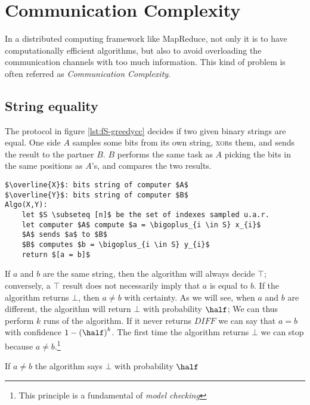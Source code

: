 \chapter{Communication Complexity}

In a distributed computing framework like MapReduce, not only it is to have computationally efficient algorithms, but also to avoid overloading the communication channels with too much information. This kind of problem is often referred as \emph{Communication Complexity}.

\section{String equality}
The protocol in figure \ref{lst:fS-greedycc} decides if two given binary strings are equal. One side $A$ samples some bits from its own string, \textsc{xor}s them, and sends the result to the partner $B$. $B$ performs the same task as $A$ picking the bits in the same positions as $A$'s, and compares the two results.
\begin{lstlisting}[caption={Greedy algorithm},label={lst:fS-greedycc}]
$\overline{X}$: bits string of computer $A$
$\overline{Y}$: bits string of computer $B$
Algo(X,Y):
    let $S \subseteq [n]$ be the set of indexes sampled u.a.r.
    let computer $A$ compute $a = \bigoplus_{i \in S} x_{i}$
    $A$ sends $a$ to $B$
    $B$ computes $b = \bigoplus_{i \in S} y_{i}$
    return $[a = b]$
\end{lstlisting}

If $a$ and $b$ are the same string, then the algorithm will always decide $\top$; conversely, a $\top$ result does not necessarily imply that $a$ is equal to $b$. If the algorithm returns $\bot$, then $a \neq b$ with certainty. As we will see, when $a$ and $b$ are different, the algorithm will return $\bot$ with probability $\half$;
We can thus perform $k$ runs of the algorithm. If it never returns $DIFF$ we can say that $a = b$ with confidence $1 - \left( \half \right)^k$. The first time the algorithm returns $\bot$ we can stop because $a \neq b$.\footnote{This principle is a fundamental of \emph{model checking}}

\begin{theorem}
    If $a \neq b$ the algorithm says $\bot$ with probability $\half$
\end{theorem}

